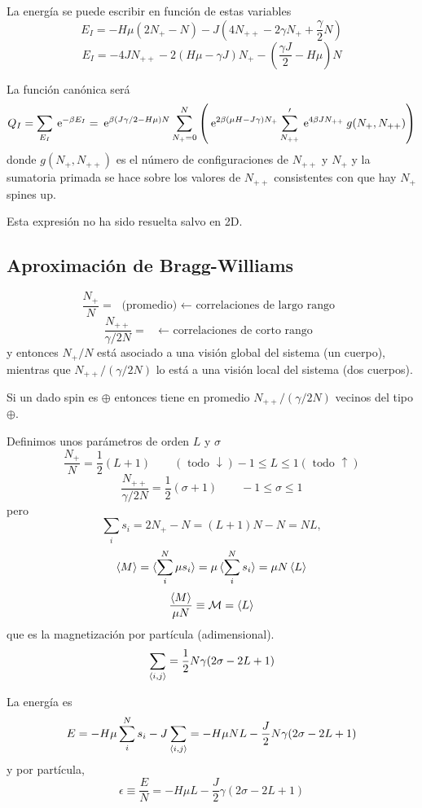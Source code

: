 \documentclass[10pt,oneside]{CBFT_book}
\begin{document}
La energía se puede escribir en función de estas variables
\[
	E_I = - H\mu (2N_+ - N) - J(4N_{++} - 2\gamma N_+ + \frac{\gamma}{2}N)
\]
\[
	E_I = -4JN_{++} - 2(H\mu - \gamma J)N_+ - \left( \frac{\gamma J}{2}- H\mu \right)N
\]


La función canónica será
\[
	Q_I = \sum_{E_I} \:\mathrm{e}^{-\beta E_I} = \:\mathrm{e}^{\beta(J\gamma/2 - H\mu)N } \sum_{N_+=0}^N
	\left( \:\mathrm{e}^{2\beta( \mu H - J\gamma )N_+ } \sum_{N_{++}}' \:\mathrm{e}^{4\beta J N_{++}}
	\: g(N_+,N_{++})\right)
\]
donde $g(N_+,N_{++})$ es el número de configuraciones de $N_{++}$ y $N_{+}$ y la sumatoria primada se hace 
sobre los valores de $N_{++}$ consistentes con que hay $N_{+}$ spines up.

Esta expresión no ha sido resuelta salvo en 2D.

\subsection{Aproximación de Bragg-Williams}

\[
	\frac{N_+}{N} = \text{ (promedio) $\leftarrow$ correlaciones de largo rango } 
\]
\[
	\frac{N_{++}}{\gamma/2 N} = \text{  $\leftarrow$ correlaciones de corto rango } 
\]
y entonces $N_{+}/N$ está asociado a una visión global del sistema (un cuerpo), 
mientras que $N_{++}/(\gamma/2 N)$ lo está a una visión local del sistema (dos cuerpos).

Si un dado spin es $\oplus$ entonces tiene en promedio $N_{++}/(\gamma/2 N)$ vecinos del tipo $\oplus$.

Definimos unos parámetros de orden $L$ y $\sigma$
\[
	\frac{N_+}{N} = \frac{1}{2}(L+1) \qquad (\text{ todo } \downarrow) -1 \leq L \leq 1 (\text{ todo } \uparrow)
\]
\[
	\frac{N_{++}}{\gamma/2 N} = \frac{1}{2}(\sigma + 1) \qquad -1 \leq \sigma \leq 1
\]
pero 
\[
	\sum_i s_i = 2N_+ - N = (L+1)N - N = NL,
\]
\[
	\braket{M} = \braket{ \sum_i^N \mu s_i } = \mu \braket{ \sum_i^N s_i } = \mu N \braket{L} 
\]
\[
	\frac{\braket{M}}{\mu N} \equiv \mathcal{M} = \braket{L}
\]
que es la magnetización por partícula (adimensional).
\[
	\sum_{\braket{i,j}} = \frac{1}{2} N \gamma (2\sigma - 2L + 1) 
\]

La energía es 
\[
	E = - H \mu \sum_i^N s_i - J \sum_{\braket{i,j}} =
	-H\mu NL - \frac{J}{2} N \gamma (2\sigma - 2L + 1) 
\]
y por partícula,
\[
	\epsilon \equiv \frac{E}{N} = -H\mu L - \frac{J}{2} \gamma (2\sigma - 2L + 1) 
\]
\end{document}
